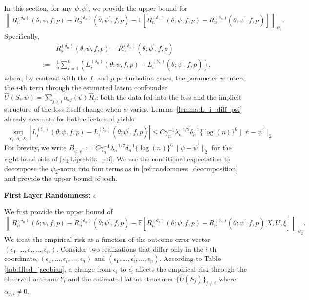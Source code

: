 \documentclass[12pt]{article}
\newcommand{\E}{\mathbb{E}}
\begin{document}
In this section, for any $\psi,\psi^\prime$, we provide the upper bound for
$$\left\|R_n^{(\delta_n)}(\theta;\psi,f,p)-R_n^{({\delta_n})}(\theta;\psi^\prime,f,p)-\E\left[R_n^{(\delta_n)}(\theta;\psi,f,p)-R_n^{({\delta_n})}(\theta;\psi^\prime,f,p)\right]\right\|_{\psi_2}.$$
Specifically, 
\begin{align*}
    &R_n^{(\delta_n)}(\theta;\psi,f,p)-R_n^{({\delta_n})}(\theta;\psi^\prime,f,p)\\
    := & \frac{1}{n}\sum_{i=1}^n \left(L^{(\delta_n)}_i(\theta;\psi,f,p) - L^{(\delta_n)}_i(\theta;\psi^\prime,f,p)\right),
\end{align*}
where, by contrast with the $f$- and $p$-perturbation cases, the parameter $\psi$ enters the $i$-th term through the estimated latent confounder $\widehat{U}(S_i,\psi)=\sum_{j\neq i}\alpha_{ij}(\psi)\widehat{R}_j$: both the data fed into the loss and the implicit structure of the loss itself change when $\psi$ varies. Lemma~\ref{lemma:L_i_diff_psi} already accounts for both effects and yields
\begin{align}
    \sup_{Y_i,A_i,X_i}\left|L^{(\delta_n)}_i(\theta;\psi,f,p) - L^{(\delta_n)}_i(\theta;\psi^\prime,f,p)\right|
    \leq C\gamma_n^{-1}\lambda_n^{-1/2} \delta_n^{-1}\{\log(n)\}^6\|\psi - \psi^\prime\|_2
    \label{eq:Lipschitz_psi}
\end{align}
For brevity, we write $B_{\psi,\psi^\prime}:= C\gamma_n^{-1}\lambda_n^{-1/2} \delta_n^{-1}\{\log(n)\}^6\|\psi - \psi^\prime\|_2$ for the right-hand side of \eqref{eq:Lipschitz_psi}.
We use the conditional expectation to decompose the $\psi_2$-norm into four terms as in \eqref{ref:randomness_decomposition} and provide the upper bound of each.


\noindent\textbf{First Layer Randomness: $\epsilon$}

\noindent We first provide the upper bound of
$$\left\|R_n^{(\delta_n)}(\theta;\psi,f,p)-R_n^{({\delta_n})}(\theta;\psi^\prime,f,p)-\E\left[R_n^{(\delta_n)}(\theta;\psi,f,p)-R_n^{({\delta_n})}(\theta;\psi^\prime,f,p)|X,U,\xi\right]\right\|_{\psi_2}.$$
We treat the empirical risk as a function of the outcome error vector $(\epsilon_1, \ldots,\epsilon_i,\ldots, \epsilon_n)$. Consider two realizations that differ only in the $i$-th coordinate, $(\epsilon_1, \ldots,\epsilon_i,\ldots, \epsilon_n)$ and $(\epsilon_1, \ldots,\epsilon_i^\prime,\ldots, \epsilon_n)$. According to Table \ref{tab:filled_jacobian}, a change from $\epsilon_i$ to $\epsilon_i^\prime$ affects the empirical risk through the observed outcome $Y_i$ and the estimated latent structures $\{\widehat U(S_j)\}_{j\neq i}$ where $\alpha_{j,i}\neq 0$.
\end{document}
